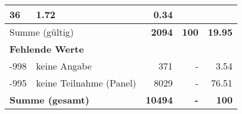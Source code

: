 \begin{longtable}{lXrrr}
       \num{36} &
       \num[round-mode=places,round-precision=2]{1,72} &
         \num[round-mode=places,round-precision=2]{0,34} \\
     \midrule
     \multicolumn{2}{l}{Summe (gültig)} &
       \textbf{\num{2094}} &
     \textbf{100} &
       \textbf{\num[round-mode=places,round-precision=2]{19,95}} \\
     \multicolumn{5}{l}{\textbf{Fehlende Werte}}\\
       -998 &
       keine Angabe &
         \num{371} &
        - &
         \num[round-mode=places,round-precision=2]{3,54} \\
       -995 &
       keine Teilnahme (Panel) &
         \num{8029} &
        - &
         \num[round-mode=places,round-precision=2]{76,51} \\
     \midrule
     \multicolumn{2}{l}{\textbf{Summe (gesamt)}} &
          \textbf{\num{10494}} &
        \textbf{-} &
        \textbf{100} \\
     \bottomrule
     \end{longtable}
     
